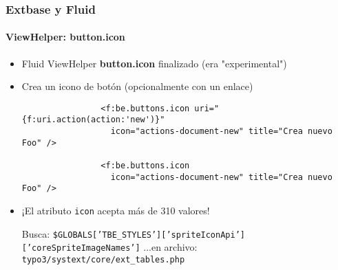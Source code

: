 \begin{frame}[fragile]
	\frametitle{Extbase y Fluid}
	\framesubtitle{ViewHelper: button.icon}

	\lstset{
		basicstyle=\smaller\ttfamily
	}

	\begin{itemize}
		\item Fluid ViewHelper \textbf{button.icon} finalizado (era "experimental")
		\item Crea un icono de botón (opcionalmente con un enlace)

			\begin{lstlisting}
				<f:be.buttons.icon uri="{f:uri.action(action:'new')}"
				  icon="actions-document-new" title="Crea nuevo Foo" />

				<f:be.buttons.icon
				  icon="actions-document-new" title="Crea nuevo Foo" />
			\end{lstlisting}

		\item ¡El atributo \texttt{icon} acepta más de 310 valores!\newline

			\smaller
				Busca:\newline
				\texttt{\$GLOBALS['TBE\_STYLES']['spriteIconApi']['coreSpriteImageNames']}\newline
				...en archivo:\newline
				\texttt{typo3/systext/core/ext\_tables.php}
			\normalsize

	\end{itemize}

\end{frame}


